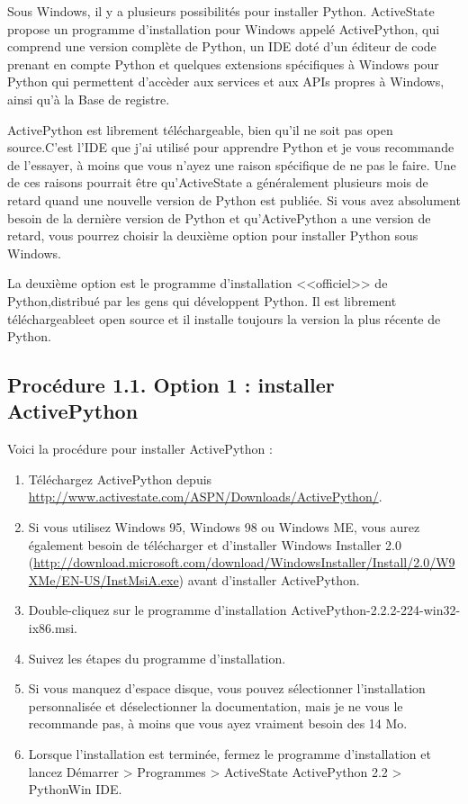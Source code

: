 Sous Windows, il y a plusieurs possibilités pour installer Python. ActiveState propose un programme d'installation pour Windows appelé ActivePython, qui comprend une version complète de Python, un IDE doté d'un éditeur de code prenant en compte Python et quelques extensions spécifiques à Windows pour Python qui permettent d'accèder aux services et aux APIs propres à Windows, ainsi qu'à la Base de registre.

ActivePython est librement téléchargeable, bien qu'il ne soit pas open source.C'est l'IDE que j'ai utilisé pour apprendre Python et je vous recommande de l'essayer, à moins que vous n'ayez une raison spécifique de ne pas le faire. Une de ces raisons pourrait être qu'ActiveState a généralement plusieurs mois de retard quand une nouvelle version de Python est publiée. Si vous avez absolument besoin de la dernière version de Python et qu'ActivePython a une version de retard, vous pourrez choisir la deuxième option pour installer Python sous Windows.

La deuxième option est le programme d'installation <<officiel>> de Python,distribué par les gens qui développent Python. Il est librement téléchargeableet open source et il installe toujours la version la plus récente de Python.

\subsection*{Procédure 1.1. Option 1 : installer ActivePython}

Voici la procédure pour installer ActivePython :

\begin{enumerate}
    \item{Téléchargez ActivePython depuis \url{http://www.activestate.com/ASPN/Downloads/ActivePython/}.}
    \item{Si vous utilisez Windows 95, Windows 98 ou Windows ME, vous aurez également besoin de télécharger et d'installer Windows Installer 2.0 (\url{http://download.microsoft.com/download/WindowsInstaller/Install/2.0/W9XMe/EN-US/InstMsiA.exe}) avant d'installer ActivePython.}
    \item{Double-cliquez sur le programme d'installation ActivePython-2.2.2-224-win32-ix86.msi.}
    \item{Suivez les étapes du programme d'installation.}
    \item{Si vous manquez d'espace disque, vous pouvez sélectionner l'installation personnalisée et déselectionner la documentation, mais je ne vous le recommande pas, à moins que vous ayez vraiment besoin des 14 Mo.}
    \item{Lorsque l'installation est terminée, fermez le programme d'installation et lancez Démarrer > Programmes > ActiveState ActivePython 2.2 > PythonWin IDE.}
\end{enumerate}

